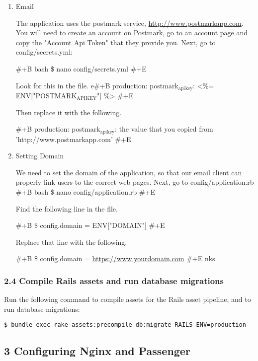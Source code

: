 \documentclass[11pt]{article}
\begin{document}
\begin{enumerate}
\item Email
\label{sec:org7524ebd}

The application uses the postmark service, \url{http://www.postmarkapp.com}. You will need to create an account on Postmark, go to an account page and copy the "Account Api Token" that they provide you.
Next, go to config/secrets.yml:

\#+B bash
\$ nano config/secrets.yml
\#+E

Look for this in the file.
e\#+B
production:
  postmark\(_{\text{api}}\)\(_{\text{key}}\): <\%= ENV["POSTMARK\(_{\text{API}}\)\(_{\text{KEY}}\)"] \%>
\#+E

Then replace it with the following.

\#+B
production:
  postmark\(_{\text{api}}\)\(_{\text{key}}\): the value that you copied from 'http://www.postmarkapp.com'
\#+E


\item Setting Domain
\label{sec:orgdd95f75}

We need to set the domain of the application, so that our email client can properly link users to the correct web pages.
Next, go to config/application.rb
\#+B bash
\$ nano config/application.rb
\#+E

Find the following line in the file.

\#+B
\$ config.domain = ENV["DOMAIN"]       
\#+E

Replace that line with the following.

\#+B
\$ config.domain = \url{https://www.yourdomain.com}       
\#+E
nks
\end{enumerate}
\subsubsection{2.4 Compile Rails assets and run database migrations}
\label{sec:orgafddb4a}

Run the following command to compile assets for the Rails asset pipeline, and to run database migrations:
\begin{verbatim}
$ bundle exec rake assets:precompile db:migrate RAILS_ENV=production
\end{verbatim}

\subsection{3 Configuring Nginx and Passenger}
\label{sec:orgc142707}
\end{document}
